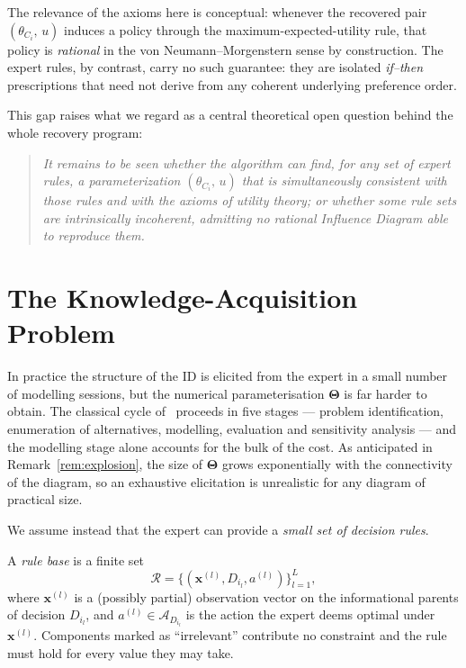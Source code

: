 The relevance of the axioms here is conceptual: whenever the
recovered pair $(\theta_{C_i},\, u)$ induces a policy through the
maximum-expected-utility rule, that policy is \emph{rational} in the
von Neumann--Morgenstern sense by construction. The expert rules, by
contrast, carry no such guarantee: they are isolated \emph{if--then}
prescriptions that need not derive from any coherent underlying
preference order.

This gap raises what we regard as a central theoretical open question
behind the whole recovery program:

\begin{quote}\itshape
It remains to be seen whether the algorithm can find, for \emph{any} set of expert rules, a parameterization $(\theta_{C_i},\, u)$ that is simultaneously consistent with those
rules and with the axioms of utility theory; or whether some rule
sets are intrinsically incoherent, admitting no rational Influence
Diagram able to reproduce them.
\end{quote}

\section{The Knowledge-Acquisition Problem}

In practice the structure of the ID is elicited from the expert in a
small number of modelling sessions, but the numerical
parameterisation $\boldsymbol{\Theta}$ is far harder to obtain. The
classical cycle of~\cite{bielza2000issues,bielza2010modeling} proceeds in
five stages — problem identification, enumeration of alternatives,
modelling, evaluation and sensitivity analysis — and the modelling
stage alone accounts for the bulk of the cost. As anticipated in
Remark~\ref{rem:explosion}, the size of $\boldsymbol{\Theta}$ grows
exponentially with the connectivity of the diagram, so an exhaustive
elicitation is unrealistic for any diagram of practical size.

We assume instead that the expert can provide a \emph{small set of
decision rules}.

\begin{definition}
\label{def:rules}
A \emph{rule base} is a finite set
\[
   \mathcal{R} = \bigl\{(\mathbf{x}^{(l)}, D_{i_l}, a^{(l)})\bigr\}_{l=1}^{L},
\]
where $\mathbf{x}^{(l)}$ is a (possibly partial) observation vector
on the informational parents of decision $D_{i_l}$, and
$a^{(l)}\in\mathcal{A}_{D_{i_l}}$ is the action the expert deems
optimal under $\mathbf{x}^{(l)}$. Components marked as
``irrelevant'' contribute no constraint and the rule must hold for
every value they may take.
\end{definition}

